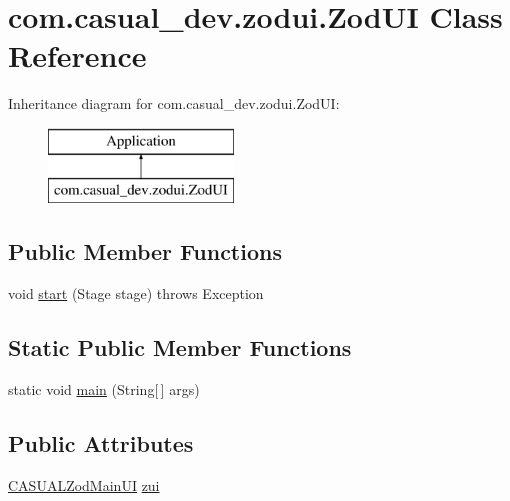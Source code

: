 \hypertarget{classcom_1_1casual__dev_1_1zodui_1_1_zod_u_i}{\section{com.\-casual\-\_\-dev.\-zodui.\-Zod\-U\-I Class Reference}
\label{classcom_1_1casual__dev_1_1zodui_1_1_zod_u_i}
}
Inheritance diagram for com.\-casual\-\_\-dev.\-zodui.\-Zod\-U\-I\-:\begin{figure}[H]
\begin{center}
\leavevmode
\includegraphics[height=2.000000cm]{classcom_1_1casual__dev_1_1zodui_1_1_zod_u_i}
\end{center}
\end{figure}
\subsection*{Public Member Functions}
\begin{DoxyCompactItemize}
\item 
void \hyperlink{classcom_1_1casual__dev_1_1zodui_1_1_zod_u_i_a6d78c2007024f3efa9897de4548834d1}{start} (Stage stage)  throws Exception 
\end{DoxyCompactItemize}
\subsection*{Static Public Member Functions}
\begin{DoxyCompactItemize}
\item 
static void \hyperlink{classcom_1_1casual__dev_1_1zodui_1_1_zod_u_i_aaaf16688c28ea6ac3e7f8c4df49d6fb2}{main} (String\mbox{[}$\,$\mbox{]} args)
\end{DoxyCompactItemize}
\subsection*{Public Attributes}
\begin{DoxyCompactItemize}
\item 
\hyperlink{classcom_1_1casual__dev_1_1zodui_1_1_c_a_s_u_a_l_zod_main_u_i}{C\-A\-S\-U\-A\-L\-Zod\-Main\-U\-I} \hyperlink{classcom_1_1casual__dev_1_1zodui_1_1_zod_u_i_a32e53f2c13b6aee68af51ddaf39671bc}{zui}
\end{DoxyCompactItemize}


